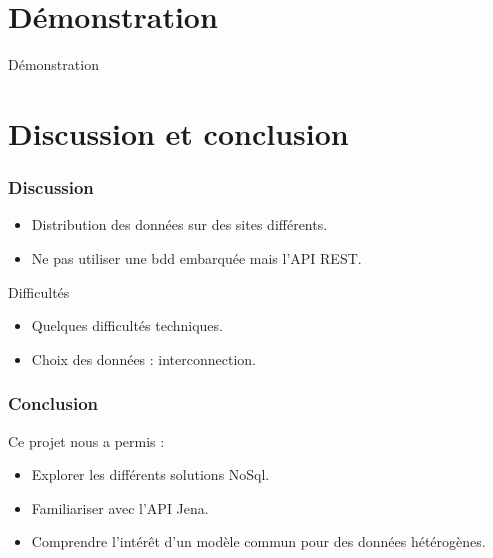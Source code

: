 \documentclass[12pt]{beamer}
\begin{document}
\section{Démonstration}

\begin{frame}

\begin{center}
\huge Démonstration

\end{center}
\end{frame}
\section{Discussion et conclusion}

\begin{frame}


\frametitle{Discussion}
\begin{itemize}
\item Distribution des données sur des sites différents.
\item Ne pas utiliser une bdd embarquée mais l'API REST.
\end{itemize}
\begin{block}{Difficultés}
\begin{itemize}
\item Quelques difficultés techniques.
\item Choix des données : interconnection.
\end{itemize}
\end{block}
\end{frame}
\begin{frame}


\frametitle{Conclusion}
Ce projet nous a permis :
\begin{itemize}
\item Explorer les différents solutions NoSql.
\item Familiariser avec l'API Jena.
\item Comprendre l'intérêt d'un modèle commun pour des données hétérogènes. 
\end{itemize}

\end{frame}
\end{document}
